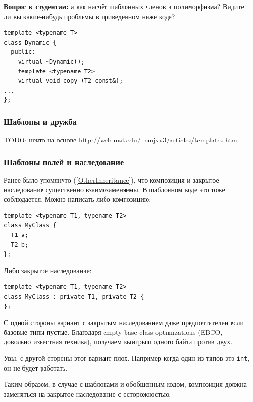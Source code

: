 \documentclass[a4paper,12pt,oneside]{article}
\newif\ifanswers
\begin{document}
\textbf{Вопрос к студентам:} а как насчёт шаблонных членов и полиморфизма? Видите ли вы какие-нибудь проблемы в приведенном ниже коде?

\begin{lstlisting}
template <typename T> 
class Dynamic { 
  public: 
    virtual ~Dynamic();
    template <typename T2> 
    virtual void copy (T2 const&); 
...
};
\end{lstlisting}

\ifanswers
Правильный ответ: да, проблемы есть. Обычный механизм виртуальных функций полагается на виртуальные таблицы фиксированного размера, однако количество актуальных экземпляров шаблонного метода может быть любым. Поэтому такие трюки в языке запрещены.
\fi

\subsubsection{Шаблоны и дружба}

TODO: нечто на основе http://web.mst.edu/~nmjxv3/articles/templates.html

\subsubsection{Шаблоны полей и наследование}\label{TemplPrivate}

Ранее было упомянуто (\ref{OtherInheritance}), что композиция и закрытое наследование существенно взаимозаменяемы. В шаблонном коде это тоже соблюдается. Можно написать либо композицию:

\begin{lstlisting}
template <typename T1, typename T2> 
class MyClass { 
  T1 a; 
  T2 b; 
}; 
\end{lstlisting}

Либо закрытое наследование:

\begin{lstlisting}
template <typename T1, typename T2> 
class MyClass : private T1, private T2 { 
}; 
\end{lstlisting}

С одной стороны вариант с закрытым наследованием даже предпочтителен если базовые типы пустые. Благодаря empty base class optimizations (EBCO, довольно известная техника), получаем выигрыш одного байта против двух.

Увы, с другой стороны этот вариант плох. Например когда один из типов это \lstinline!int!, он не будет работать.

Таким образом, в случае с шаблонами и обобщенным кодом, композиция должна заменяться на закрытое наследование с осторожностью.
\end{document}
